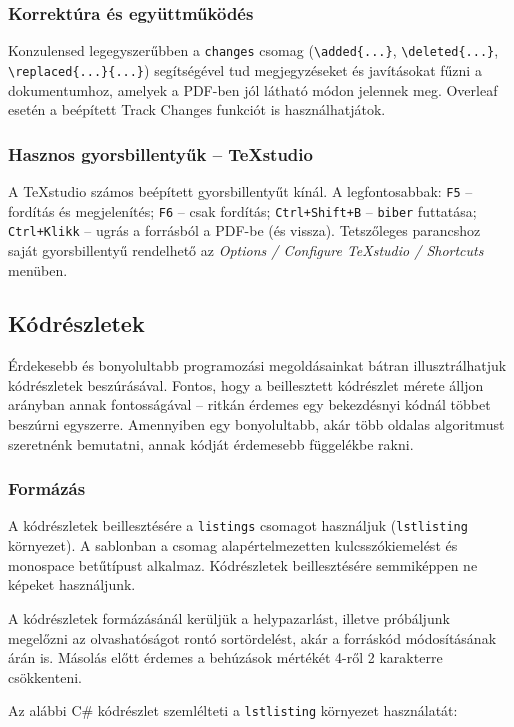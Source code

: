 \documentclass{sapientia-thesis}
\begin{document}
\subsubsection{Korrektúra és együttműködés}
Konzulensed legegyszerűbben a \texttt{changes} csomag (\verb|\added{...}|, \verb|\deleted{...}|, \verb|\replaced{...}{...}|) segítségével tud megjegyzéseket és javításokat fűzni a dokumentumhoz, amelyek a PDF-ben jól látható módon jelennek meg. Overleaf esetén a beépített Track Changes funkciót is használhatjátok.

\subsubsection{Hasznos gyorsbillentyűk -- TeXstudio}
A TeXstudio számos beépített gyorsbillentyűt kínál. A legfontosabbak: \texttt{F5} -- fordítás és megjelenítés; \texttt{F6} -- csak fordítás; \texttt{Ctrl+Shift+B} -- \texttt{biber} futtatása; \texttt{Ctrl+Klikk} -- ugrás a forrásból a PDF-be (és vissza). Tetszőleges parancshoz saját gyorsbillentyű rendelhető az \textit{Options / Configure TeXstudio / Shortcuts} menüben.

\subsection{Kódrészletek}
Érdekesebb és bonyolultabb programozási megoldásainkat bátran illusztrálhatjuk kódrészletek beszúrásával. Fontos, hogy a beillesztett kódrészlet mérete álljon arányban annak fontosságával -- ritkán érdemes egy bekezdésnyi kódnál többet beszúrni egyszerre. Amennyiben egy bonyolultabb, akár több oldalas algoritmust szeretnénk bemutatni, annak kódját érdemesebb függelékbe rakni.

\subsubsection{Formázás}
A kódrészletek beillesztésére a \texttt{listings} csomagot használjuk (\texttt{lstlisting} környezet). A sablonban a csomag alapértelmezetten kulcsszókiemelést és monospace betűtípust alkalmaz. Kódrészletek beillesztésére semmiképpen ne képeket használjunk.

A kódrészletek formázásánál kerüljük a helypazarlást, illetve próbáljunk megelőzni az olvashatóságot rontó sortördelést, akár a forráskód módosításának árán is. Másolás előtt érdemes a behúzások mértékét 4-ről 2 karakterre csökkenteni.

Az alábbi C\# kódrészlet szemlélteti a \texttt{lstlisting} környezet használatát:
\end{document}

